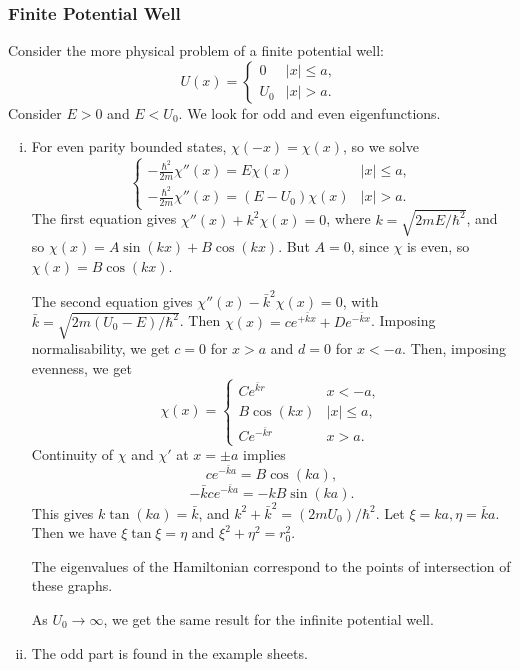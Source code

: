 \documentclass[12pt]{article}
\begin{document}
\subsubsection{Finite Potential Well}%
\label{subsub:finite_potential_well}

Consider the more physical problem of a finite potential well:
\[
	U(x) =
	\begin{cases}
		0 & |x| \leq a, \\
		U_0 & |x| > a.
	\end{cases}
\]
Consider $E > 0$ and $E < U_0$. We look for odd and even eigenfunctions.
\begin{enumerate}[(i)]
	\item For even parity bounded states, $\chi(-x) = \chi(x)$, so we solve
		\[
		\begin{cases}
			-\frac{\hbar^2}{2m} \chi''(x) = E \chi(x) & |x| \leq a,\\
			-\frac{\hbar^2}{2m}\chi''(x) = (E - U_0)\chi(x) & |x| > a.
		\end{cases}
		\]
		The first equation gives $\chi''(x) + k^2 \chi(x) = 0$, where $k = \sqrt{2mE/\hbar^2}$, and so $\chi(x) = A \sin (kx) + B \cos (kx)$. But $A = 0$, since $\chi$ is even, so $\chi(x) = B \cos (kx)$.

		The second equation gives $\chi''(x) - \bar k^2 \chi(x) = 0$, with $\bar k = \sqrt{2m(U_0 - E)/\hbar^2}$. Then $\chi(x) = ce^{+\bar k x} + D e^{- \bar k x}$. Imposing normalisability, we get $c = 0$ for $x > a$ and $d = 0$ for $x < -a$. Then, imposing evenness, we get
		\[
			\chi(x) =
			\begin{cases}
				C e^{\bar k r} & x < -a, \\
				B \cos (kx) & |x| \leq a, \\
				C e^{-\bar k r} &  x > a.
			\end{cases}
		\]
		Continuity of $\chi$ and $\chi'$ at $x = \pm a$ implies
		\[
			c e^{- \bar k a} = B \cos (k a)
		,\]
		\[
			- \bar k c e^{- \bar k a} = - k B \sin (k a)
		.\]
		This gives $k \tan (ka) = \bar k$, and $k^2 + \bar k^2 = (2mU_0)/\hbar^2$. Let $\xi = k a, \eta = \bar k a$. Then we have $\xi \tan \xi = \eta$ and $\xi^2 + \eta^2 = r_0^2$.

		The eigenvalues of the Hamiltonian correspond to the points of intersection of these graphs.

		As $U_0 \to \infty$, we get the same result for the infinite potential well.
	\item The odd part is found in the example sheets.
\end{enumerate}
\end{document}
